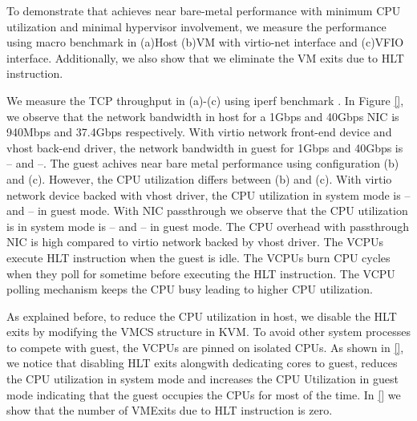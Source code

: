 
To demonstrate that \na achieves near bare-metal 
performance with minimum CPU utilization and minimal
hypervisor involvement, we measure the performance using
macro benchmark in (a)Host (b)VM with virtio-net
interface and (c)VFIO interface. Additionally, we
also show that we eliminate the VM exits due to 
HLT instruction.

We measure the TCP throughput in (a)-(c) using iperf
benchmark \cite{}. In Figure \ref{}, we observe that the
network bandwidth in host for a 1Gbps and 40Gbps NIC
is 940Mbps and 37.4Gbps respectively. With virtio network
front-end device and vhost back-end driver, the network
bandwidth in guest for 1Gbps and 40Gbps is -- and --. The
guest achives near bare metal performance using 
configuration (b) and (c). However, the CPU
utilization differs between (b) and (c). With virtio
network device backed with vhost driver, the CPU 
utilization in system mode is -- and -- in guest mode.
With NIC passthrough we observe that the CPU utilization 
is in system mode is -- and -- in guest mode. The CPU 
overhead with passthrough NIC is high compared to 
virtio network backed by vhost driver.
The VCPUs execute HLT instruction when the guest is idle.
The VCPUs burn CPU cycles when they poll for sometime
before executing the HLT instruction. The VCPU polling
mechanism keeps the CPU busy leading to higher CPU 
utilization.

As explained before, to reduce the CPU utilization in 
host, we disable the HLT exits by modifying the VMCS 
structure in KVM. To avoid other system processes 
to compete with guest, the VCPUs are pinned on isolated 
CPUs. As shown in \ref{}, we notice that disabling HLT exits 
alongwith dedicating cores to guest, reduces the 
CPU utilization in system
mode and increases the CPU Utilization in guest mode
indicating that the guest occupies the CPUs for most
of the time. In \ref{} we show that the number of VMExits
due to HLT instruction is zero.

